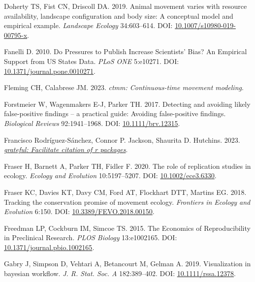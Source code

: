 \documentclass[10pt,a4paper]{article}
\newlength{\cslhangindent}
\newenvironment{CSLReferences}[2] %
 {\begin{list}{}{%
  \setlength{\itemindent}{0pt}
  \setlength{\leftmargin}{0pt}
  \setlength{\parsep}{0pt}
  \ifodd #1
   \setlength{\leftmargin}{\cslhangindent}
   \setlength{\itemindent}{-1\cslhangindent}
  \fi
  \setlength{\itemsep}{#2\baselineskip}}}
 {\end{list}}
\begin{document}
\begin{CSLReferences}{1}{0}
Doherty TS, Fist CN, Driscoll DA. 2019. Animal movement varies with resource availability, landscape configuration and body size: A conceptual model and empirical example. \emph{Landscape Ecology} 34:603--614. DOI: \href{https://doi.org/10.1007/s10980-019-00795-x}{10.1007/s10980-019-00795-x}.

Fanelli D. 2010. Do {Pressures} to {Publish} {Increase} {Scientists}' {Bias}? {An} {Empirical} {Support} from {US} {States} {Data}. \emph{PLoS ONE} 5:e10271. DOI: \href{https://doi.org/10.1371/journal.pone.0010271}{10.1371/journal.pone.0010271}.

Fleming CH, Calabrese JM. 2023. \emph{{ctmm}: Continuous-time movement modeling}.

Forstmeier W, Wagenmakers E-J, Parker TH. 2017. Detecting and avoiding likely false-positive findings -- a practical guide: {Avoiding} false-positive findings. \emph{Biological Reviews} 92:1941--1968. DOI: \href{https://doi.org/10.1111/brv.12315}{10.1111/brv.12315}.

Francisco Rodríguez-Sánchez, Connor P. Jackson, Shaurita D. Hutchins. 2023. \emph{\href{https://github.com/Pakillo/grateful}{{grateful}: Facilitate citation of r packages}}.

Fraser H, Barnett A, Parker TH, Fidler F. 2020. The role of replication studies in ecology. \emph{Ecology and Evolution} 10:5197--5207. DOI: \href{https://doi.org/10.1002/ece3.6330}{10.1002/ece3.6330}.

Fraser KC, Davies KT, Davy CM, Ford AT, Flockhart DTT, Martins EG. 2018. Tracking the conservation promise of movement ecology. \emph{Frontiers in Ecology and Evolution} 6:150. DOI: \href{https://doi.org/10.3389/FEVO.2018.00150}{10.3389/FEVO.2018.00150}.

Freedman LP, Cockburn IM, Simcoe TS. 2015. The {Economics} of {Reproducibility} in {Preclinical} {Research}. \emph{PLOS Biology} 13:e1002165. DOI: \href{https://doi.org/10.1371/journal.pbio.1002165}{10.1371/journal.pbio.1002165}.

Gabry J, Simpson D, Vehtari A, Betancourt M, Gelman A. 2019. Visualization in bayesian workflow. \emph{J. R. Stat. Soc. A} 182:389--402. DOI: \href{https://doi.org/10.1111/rssa.12378}{10.1111/rssa.12378}.


\end{CSLReferences}
\end{document}
